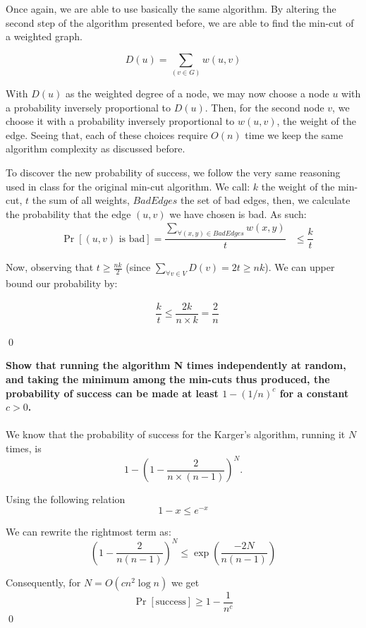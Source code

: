 \documentclass{article}
\begin{document}
Once again, we are able to use basically the same algorithm. By altering the second step of the algorithm presented before, we are able to find the min-cut of a weighted graph. 

\[D(u) = \sum_{(v \in G)} w(u, v)\]

With \(D(u)\) as the weighted degree of a node, we may now choose a node \(u\) with a probability inversely proportional to \(D(u)\). Then, for the second node \(v\), we choose it with a probability inversely proportional to \(w(u, v)\), the weight of the edge. Seeing that, each of these choices require \(O(n)\) time we keep the same algorithm complexity as discussed before.

To discover the new probability of success, we follow the very same reasoning used in class for the original min-cut algorithm. We call: \(k\) the weight of the min-cut, \(t\) the sum of all weights, \(BadEdges\) the set of bad edges, then, we calculate the probability that the edge \((u, v)\) we have chosen is bad. As such:
\[
	\begin{aligned}
		& \Pr[(u,v ) \text{ is bad}] = \dfrac{\sum_{\forall (x, y) \in BadEdges} w(x, y)}{t}
		& \leq \dfrac{k}{t} 
	\end{aligned}
\]

Now, observing that \(t\geq \frac{nk}{2}\) (since \( \sum_{\forall v \in V} D(v) = 2t \geq nk \)). We can upper bound our probability by:   

\[
	\begin{aligned}
		& \dfrac{k}{t}
        \leq
        \dfrac{2k}{n \times k}
        =
        \dfrac{2}{n}
	\end{aligned}
\]

\qed

\pagebreak

\textbf{Show that running the algorithm N times independently at random, and taking the minimum among
the min-cuts thus produced, the probability of success can be made at least \(1 - (1/n)^c\) for a constant \(c > 0\).}
\\
\\
We know that the probability of success for the Karger's algorithm, running it \(N\) times, is
\[
	1 - \left( 1 - \dfrac{2}{n\times(n-1)} \right)^N.
\]

Using the following relation
\[1 - x \leq e^{-x}\]

We can rewrite the rightmost term as:
\[
	\left( 1 - \dfrac{2}{n(n-1)} \right)^N \leq \exp\left(\dfrac{-2N}{n(n-1)}\right)
\]

Consequently, for \(N = O(cn^2 \log n)\) we get
\[
	\Pr[\text{success}] \geq 1 - \dfrac{1}{n^c}
\]
\qed
\end{document}
